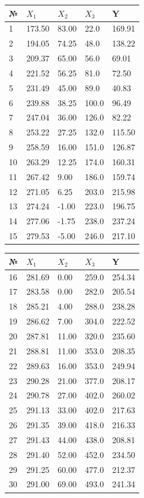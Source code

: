 \documentclass{article}
\begin{document}
      \begin{center}
        \begin{tabular}{|l|l|l|l|l|}
          \hline
          № & $X_1$ &	$X_2$ &	$X_3$ &	Y \\
          \hline
          1 &	173.50 &	83.00 &	22.0 & 169.91\\
          2 &	194.05 &	74.25 &	48.0 & 138.22\\
          3 &	209.37 &	65.00 &	56.0 & 69.01\\
          4 &	221.52 &	56.25 &	81.0 & 72.50\\
          5 &	231.49 &	45.00 &	89.0 & 40.83\\
          6 &	239.88 &	38.25 &	100.0 &	96.49\\
          7 &	247.04 &	36.00 &	126.0 &	82.22\\
          8 &	253.22 &	27.25 &	132.0 &	115.50\\
          9 &	258.59 &	16.00 &	151.0 &	126.87\\
          10 & 263.29 &	12.25 &	174.0 &	160.31\\
          11 & 267.42 &	9.00 & 186.0 & 159.74\\
          12 & 271.05 &	6.25 & 203.0 & 215.98\\
          13 & 274.24 &	-1.00 &	223.0 &	196.75\\
          14 & 277.06 &	-1.75 &	238.0 &	237.24\\
          15 & 279.53 &	-5.00 &	246.0 &	217.10\\
          \hline
        \end{tabular}
        \begin{tabular}{|l|l|l|l|l|}
          \hline
          № & $X_1$ &	$X_2$ &	$X_3$ &	Y \\
          \hline
          16 & 281.69 &	0.00 & 259.0 & 254.34\\
          17 & 283.58 &	0.00 & 282.0 & 205.54\\
          18 & 285.21 &	4.00 & 288.0 & 238.28\\
          19 & 286.62 &	7.00 & 304.0 & 222.52\\
          20 & 287.81 &	11.00 &	320.0 &	235.60\\
          21 & 288.81 &	11.00 &	353.0 &	208.35\\
          22 & 289.63 &	16.00 &	353.0 &	249.94\\
          23 & 290.28 &	21.00 &	377.0 &	208.17\\
          24 & 290.78 &	27.00 &	402.0 &	260.02\\
          25 & 291.13 &	33.00 &	402.0 &	217.63\\
          26 & 291.35 &	39.00 &	418.0 &	216.33\\
          27 & 291.43 &	44.00 &	438.0 &	208.81\\
          28 & 291.40 &	52.00 &	452.0 &	234.50\\
          29 & 291.25 &	60.00 &	477.0 &	212.37\\
          30 & 291.00 &	69.00 &	493.0 &	241.34\\
          \hline
        \end{tabular}
      \end{center}
\end{document}
